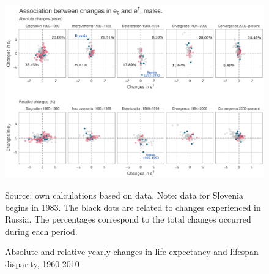 \documentclass{article}
\begin{document}
\begin{figure}[h!]
\centering
\caption{Absolute and relative yearly changes in life expectancy and lifespan disparity, 1960-2010}
\label{Abs_changes}
\begin{center}
\vspace{-.5cm}
\includegraphics[scale=.45]{Figures/changes_males.pdf}
\end{center}
Source: own calculations based on \citet{HMD} data. Note: data for Slovenia begins in 1983. The black dots are related to changes experienced in Russia. The percentages correspond to the total changes occurred during each period.
\end{figure}

\newpage
\end{document}
